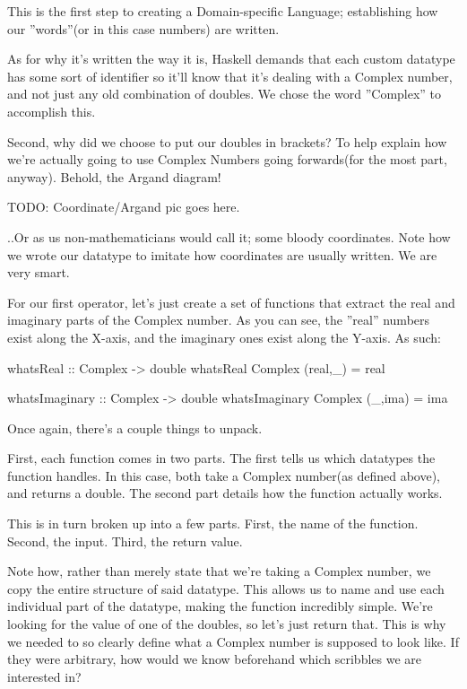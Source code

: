 This is the first step to creating a Domain-specific Language; establishing how our ''words''(or in this case numbers) are written.

As for why it's written the way it is, Haskell demands that each custom datatype has some sort of identifier so it'll know that it's dealing with a Complex number, and not just any old combination of doubles. We chose the word ''Complex'' to accomplish this.

Second, why did we choose to put our doubles in brackets? To help explain how we're actually going to use Complex Numbers going forwards(for the most part, anyway). Behold, the Argand diagram!

TODO: Coordinate/Argand pic goes here.

..Or as us non-mathematicians would call it; some bloody coordinates. Note how we wrote our datatype to imitate how coordinates are usually written. We are very smart.


For our first operator, let's just create a set of functions that extract the real and imaginary parts of the Complex number. As you can see, the ''real'' numbers exist along the X-axis, and the imaginary ones exist along the Y-axis. As such:
\begin{code}
whatsReal :: Complex -> double
whatsReal Complex (real,_) = real

whatsImaginary :: Complex -> double
whatsImaginary Complex (_,ima) = ima
\end{code}
Once again, there's a couple things to unpack.

First, each function comes in two parts. The first tells us which datatypes the function handles. In this case, both take a Complex number(as defined above), and returns a double. The second part details how the function actually works.

This is in turn broken up into a few parts. First, the name of the function. Second, the input. Third, the return value.

Note how, rather than merely state that we're taking a Complex number, we copy the entire structure of said datatype. This allows us to name and use each individual part of the datatype, making the function incredibly simple. We're looking for the value of one of the doubles, so let's just return that. This is why we needed to so clearly define what a Complex number is supposed to look like. If they were arbitrary, how would we know beforehand which scribbles we are interested in?

